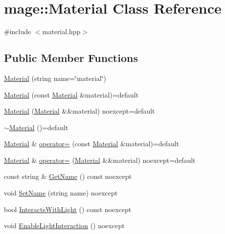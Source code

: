 \hypertarget{classmage_1_1_material}{}\section{mage\+:\+:Material Class Reference}
\label{classmage_1_1_material}


{\ttfamily \#include $<$material.\+hpp$>$}

\subsection*{Public Member Functions}
\begin{DoxyCompactItemize}
\item 
\hyperlink{classmage_1_1_material_a6f3ba50e9dfd73ce41473563d0ab3c20}{Material} (string name=\char`\"{}material\char`\"{})
\item 
\hyperlink{classmage_1_1_material_abed630412cdc4a6281389d128ec4b5f3}{Material} (const \hyperlink{classmage_1_1_material}{Material} \&material)=default
\item 
\hyperlink{classmage_1_1_material_a378f529bd1954b81cb2431f40e772adb}{Material} (\hyperlink{classmage_1_1_material}{Material} \&\&material) noexcept=default
\item 
\hyperlink{classmage_1_1_material_a4ca65b7e24144ee08dd1ce8d0eda9284}{$\sim$\+Material} ()=default
\item 
\hyperlink{classmage_1_1_material}{Material} \& \hyperlink{classmage_1_1_material_a7ebc9986924ca13ae8468005518dcfc7}{operator=} (const \hyperlink{classmage_1_1_material}{Material} \&material)=default
\item 
\hyperlink{classmage_1_1_material}{Material} \& \hyperlink{classmage_1_1_material_a06bd167b9a8f329a18c2f55f830194ed}{operator=} (\hyperlink{classmage_1_1_material}{Material} \&\&material) noexcept=default
\item 
const string \& \hyperlink{classmage_1_1_material_a9edb2f437eca07c6c12c24d10ec30eb3}{Get\+Name} () const noexcept
\item 
void \hyperlink{classmage_1_1_material_ad1083b74b6939f909eb471e0f45f63cb}{Set\+Name} (string name) noexcept
\item 
bool \hyperlink{classmage_1_1_material_a9bb48fe0f9f8d2c21073bdf650957bd6}{Interacts\+With\+Light} () const noexcept
\item 
void \hyperlink{classmage_1_1_material_abbcdcc3a9cb44c854212508c8419aa7f}{Enable\+Light\+Interaction} () noexcept
\item 

\end{DoxyCompactItemize}

